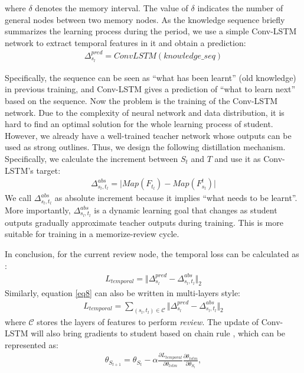 \documentclass[letterpaper]{article} %
\begin{document}
\noindent where $\delta$ denotes the memory interval. The value of $\delta$ indicates the number of general nodes between two memory nodes. As the knowledge sequence briefly summarizes the learning process during the period, we use a simple Conv-LSTM network to extract temporal features in it and obtain a prediction:
\begin{align}
    \Delta_{s_{l}}^{pred} = ConvLSTM(knowledge\_seq)
\end{align}

Specifically, the sequence can be seen as ``what has been learnt'' (old knowledge) in previous training, and Conv-LSTM gives a prediction of ``what to learn next'' based on the sequence. Now the problem is the training of the Conv-LSTM network. Due to the complexity of neural network and data distribution, it is hard to find an optimal solution for the whole learning process of student. However, we already have a well-trained teacher network whose outputs can be used as strong outlines. Thus, we design the following distillation mechanism. Specifically, we calculate the increment between $S_{t}$ and $T$ and use it as Conv-LSTM's target:
\begin{align}
    \Delta^{abs}_{s_{l},t_{l}} = \Big|Map(F_{t_{l}})-Map(F_{s_{l}}^{t})\Big|
\end{align}
We call $\Delta^{abs}_{s_{l},t_{l}}$ as absolute increment because it implies ``what needs to be learnt''. More importantly, $\Delta^{abs}_{s_{l},t_{l}}$ is a dynamic learning goal that changes as student outputs gradually approximate teacher outputs during training. This is more suitable for training in a memorize-review cycle.

In conclusion, for the current review node, the temporal loss can be calculated as :
\begin{align}
    L_{temporal} =  \Big\Vert \Delta_{s_{l}}^{pred} -\Delta^{abs}_{s_{l},t_{l}}\Big\Vert_{2}
    \label{eq8}
\end{align}
Similarly, equation \ref{eq8} can also be written in multi-layers style:
\begin{align}
    L_{temporal} = \sum_{(s_{l},t_{l})\in \mathcal{C}} \Big\Vert \Delta_{s_{l}}^{pred} -\Delta^{abs}_{s_{l},t_{l}}\Big\Vert_{2}
\end{align}
where $\mathcal{C}$ stores the layers of features to perform \emph{review}. The update of Conv-LSTM will also bring gradients to student based on chain rule , which can be represented as:
\begin{align}
    \theta_{S_{t+1}} = \theta_{S_{t}} - \alpha \frac{\partial L_{temporal}}{\partial \theta_{lstm}}\frac{\partial \theta_{lstm}}{\partial \theta_{S_{t}}},
\end{align}
\end{document}

